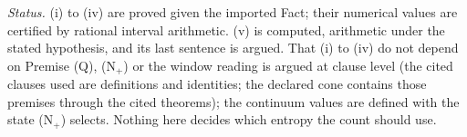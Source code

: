 \emph{Status.} (i) to (iv) are proved given the imported Fact; their numerical values are certified by rational interval arithmetic. (v) is computed, arithmetic under the stated hypothesis, and its last sentence is argued. That (i) to (iv) do not depend on Premise (Q), (N$_{+}$) or the window reading is argued at clause level (the cited clauses used are definitions and identities; the declared cone contains those premises through the cited theorems); the continuum values are defined with the state (N$_{+}$) selects. Nothing here decides which entropy the count should use.
